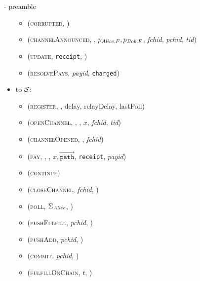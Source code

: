 \begin{figure}[H]
\begin{systembox}{\fpaynet - preamble}
\begin{itemize}
\begin{itemize}
          \item (\textsc{corrupted}, \alice)
          \item (\textsc{channelAnnounced}, \alice, $p_{\mathit{Alice}, F}, p_{\mathit{Bob},
          F}$, \textit{fchid}, \textit{pchid}, \textit{tid})
          \item (\textsc{update}, \texttt{receipt}, \alice)
          \item (\textsc{resolvePays}, \textit{payid}, \texttt{charged})
        \end{itemize}
        \item to $\mathcal{S}$:
        \begin{itemize}
          \item (\textsc{register}, \alice, delay, relayDelay, lastPoll)
          \item (\textsc{openChannel}, \alice, \bob, $x$, \textit{fchid},
          \textit{tid})
          \item (\textsc{channelOpened}, \alice, \textit{fchid})
          \item (\textsc{pay}, \alice, \bob, $x,
          \overrightarrow{\mathtt{path}}$, \texttt{receipt}, \textit{payid})
          \item (\textsc{continue})
          \item (\textsc{closeChannel}, \textit{fchid}, \alice)
          \item (\textsc{poll}, $\Sigma_{\mathit{Alice}}$, \alice)
          \item (\textsc{pushFulfill}, \textit{pchid}, \alice)
          \item (\textsc{pushAdd}, \textit{pchid}, \alice)
          \item (\textsc{commit}, \textit{pchid}, \alice)
          \item (\textsc{fulfillOnChain}, $t$, \alice)
        \end{itemize}
      \end{itemize}
    \end{systembox}
    \caption{}
    \label{alg:fpaynet:interface}
  \end{figure}

